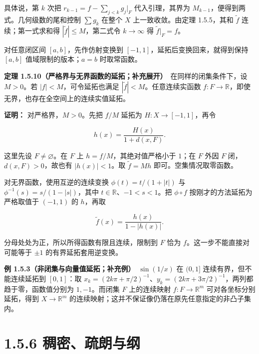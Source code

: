 \documentclass[11pt,a4paper]{article}
\begin{document}
具体说，第 \(k\) 次把 \(r_{k-1}=f-\sum_{j<k}g_j|_F\) 代入引理，其界为
\(M_{k-1}\)，便得到两式。几何级数的尾和控制 \(\sum g_k\) 在整个 \(X\)
上一致收敛。由定理 1.5.5，其和 \(\widetilde f\) 连续；第一式求和得
\(|\widetilde f|\le M\)，第二式令 \(k\to\infty\) 得
\(\widetilde f|_F=f\)。

对任意闭区间 \([a,b]\)，先作仿射变换到
\([-1,1]\)，延拓后变换回来，就得到保持 \([a,b]\) 值域限制的版本；\(a=b\)
时取常函数。

\textbf{定理
1.5.10（严格界与无界函数的延拓；补充展开）}　在同样的闭集条件下，设
\(M>0\)。若 \(|f|<M\)，可令延拓也满足
\(|\widetilde f|<M\)。任意连续实函数
\(f:F\to\mathbb R\)，即使无界，也存在全空间上的连续实值延拓。

\textbf{证明：} 对严格界，\(M>0\)。先把 \(f/M\) 延拓为
\(H:X\to[-1,1]\)，再令

\begin{equation*}
h(x)=\frac{H(x)}{1+d(x,F)}.
\tag{1.5.10}
\end{equation*}

这里先设 \(F\ne\varnothing\)。在 \(F\) 上 \(h=f/M\)，其绝对值严格小于
\(1\)；在 \(F\) 外因 \(F\) 闭，\(d(x,F)>0\)，故也有 \(|h(x)|<1\)。取
\(\widetilde f=Mh\) 即可。空集情况取零函数。

对无界函数，使用互逆的连续变换 \(\phi(t)=t/(1+|t|)\) 与
\(\phi^{-1}(s)=s/(1-|s|)\)，其中 \(t\in\mathbb R\)、\(-1<s<1\)。把
\(\phi\circ f\) 按刚才的方法延拓为严格取值于 \((-1,1)\) 的 \(h\)，再取

\begin{equation*}
\widetilde f(x)=\frac{h(x)}{1-|h(x)|}.
\tag{1.5.11}
\end{equation*}

分母处处为正，所以所得函数有限且连续，限制到 \(F\) 恰为
\(f\)。这一步不能直接对可能等于 \(\pm1\) 的有界延拓套用逆变换。

\textbf{例 1.5.3（非闭集与向量值延拓；补充例）}　\(\sin(1/x)\) 在
\((0,1]\) 连续有界，但不能连续延拓到 \([0,1]\)：取
\(x_k=(2k\pi+\pi/2)^{-1}\)、\(y_k=(2k\pi+3\pi/2)^{-1}\)，两列都趋于零，函数值分别为
\(1,-1\)。而闭集 \(F\) 上的连续映射 \(f:F\to\mathbb R^m\)
可对各坐标分别延拓，得到 \(X\to\mathbb R^m\)
的连续映射；这并不保证像仍落在原先任意指定的非凸子集内。

\section[\S{}1.5.6
稠密、疏朗与纲]{1.5.6
稠密、疏朗与纲}\label{ux7a20ux5bc6ux758fux6717ux4e0eux7eb2}
\end{document}
